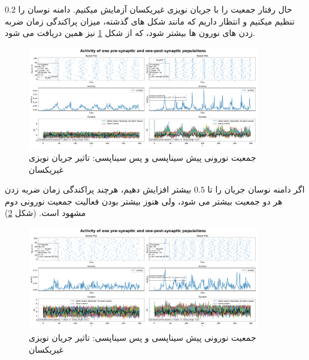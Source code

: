 \documentclass{report}
\begin{document}
        حال رفتار جمعیت را با جریان نویزی غیریکسان آزمایش میکنیم. دامنه نوسان را 
        $0.2$ 
        تنظیم میکنیم و انتظار داریم که مانند شکل های گذشته، میزان پراکندگی زمان ضربه زدن های نورون ها بیشتر شود، که از شکل 
        \ref{fig:part1-two-ng-with-synapse-diff-curr}
        نیز همین دریافت می شود.
        \begin{figure}[!ht]
            \centering
            \includegraphics[width=0.9\textwidth]{plots/part1-two-ng-with-synapse-diff-curr.pdf} 
            \caption{جمعیت نورونی پیش سیناپسی و پس سیناپسی: تاثیر جریان نویزی غیریکسان}
            \label{fig:part1-two-ng-with-synapse-diff-curr}
        \end{figure}

        اگر دامنه نوسان جریان را تا 
        $0.5$ 
        بیشتر افزایش دهیم، هرچند پراکندگی زمان ضربه زدن هر دو جمعیت بیشتر می شود، ولی هنوز بیشتر بودن فعالیت جمعیت نورونی دوم مشهود است.
        (شکل \ref{fig:part1-two-ng-with-synapse-high-diff-curr})
        \begin{figure}[!ht]
            \centering
            \includegraphics[width=0.9\textwidth]{plots/part1-two-ng-with-synapse-high-diff-curr.pdf} 
            \caption{جمعیت نورونی پیش سیناپسی و پس سیناپسی: تاثیر جریان نویزی غیریکسان}
            \label{fig:part1-two-ng-with-synapse-high-diff-curr}
        \end{figure}
 
\end{document}
